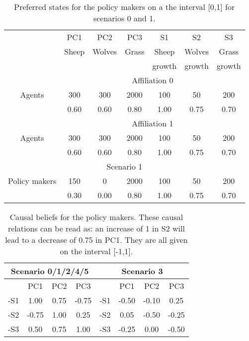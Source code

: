 \documentclass[12pt]{article}
\begin{document}

\begin{table}[h!]
\begin{center}
\begin{tabular}{ |c|c|c|c|c|c|c| } 
\hline

			& PC1	& PC2	& PC3	& S1		& S2		& S3  	\\ 
			& Sheep	& Wolves	& Grass	& Sheep	& Wolves	& Grass 	\\
			&		&		&		& growth	& growth	& growth	\\ \hline \hline
			
	 		& \multicolumn{6}{|c|}{Affiliation 0}						\\ \hline 
Agents		& 300	& 300	& 2000	& 100	& 50		& 200	\\ \hline
			& 0.60	& 0.60	& 0.80	& 1.00	& 0.75	& 0.70	\\ \hline
	 		& \multicolumn{6}{|c|}{Affiliation 1}						\\ \hline 
Agents		& 300	& 300	& 2000	& 100	& 50		& 200	\\ \hline
			& 0.60	& 0.60	& 0.80	& 1.00	& 0.75	& 0.70	\\ \hline
			
\multicolumn{7}{|c|}{Scenario 1}										\\ \hline
Policy makers	& 150	& 0		& 2000	& 100	& 50		& 200	\\ \hline
			& 0.30	& 0.00	& 0.80	& 1.00	& 0.75	& 0.70	\\ \hline
			


\end{tabular}
\end{center}
\caption{Preferred states for the policy makers on a the interval [0,1] for scenarios 0 and 1.}
\label{tab:preferredStates}
\end{table}

\begin{table}[h!]
\begin{center}
\begin{tabular}{ |c|c|c|c| |c|c|c|c|}
 \hline
\multicolumn{4}{|c||}{Scenario 0/1/2/4/5}	& \multicolumn{4}{|c|}{Scenario 3}		\\ \hline
	& PC1	& PC2	& PC3		& 		& PC1	& PC2	& PC3	\\ \hline
-S1 	& 1.00	& 0.75	&-0.75		& -S1 	&-0.50	&-0.10	& 0.25	\\ \hline
-S2 	&-0.75	& 1.00	& 0.25 		& -S2 	& 0.05	&-0.50	&-0.25 	\\ \hline
-S3 	& 0.50	& 0.75	& 1.00		& -S3 	&-0.25	& 0.00	&-0.50	\\ 
 \hline
\end{tabular}
\end{center}
\caption{Causal beliefs for the policy makers. These causal relations can be read as: an increase of 1 in S2 will lead to a decrease of 0.75 in PC1. They are all given on the interval [-1,1].}
\label{tab:causalBeliefs}
\end{table}
\end{document}
